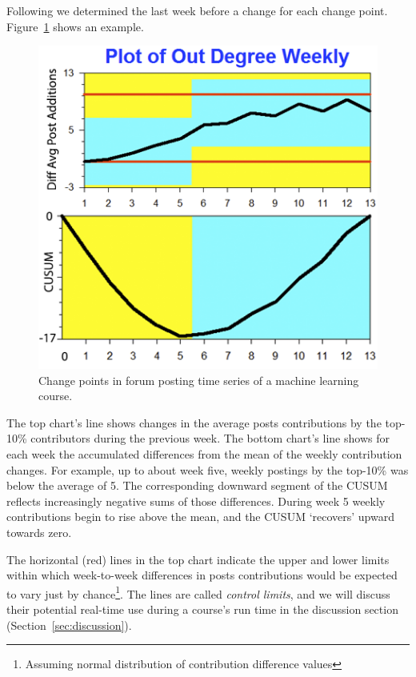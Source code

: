 
Following \cite{tayl16} we determined the last week before a change
for each change point. Figure~\ref{fig:cs229ChangePts} shows an
example.
\begin{figure}[htp]
       \centering
       \includegraphics{Figs/cs229Fall14ChangeAnalysis.png}
       \caption{\textnormal{Change points in forum posting 
           time series of a machine learning course.}}
       \label{fig:cs229ChangePts}
\end{figure}
The top chart's line shows changes in the average posts contributions
by the top-10\% contributors during the previous week. The bottom
chart's line shows for each week the accumulated differences from the
mean of the weekly contribution changes. For example, up to about week
five, weekly postings by the top-10\% was below the average of 5. The
corresponding downward segment of the CUSUM reflects increasingly
negative sums of those differences. During week 5 weekly contributions
begin to rise above the mean, and the CUSUM `recovers' upward towards
zero.

The horizontal (red) lines in the top chart indicate the upper and
lower limits within which week-to-week differences in posts
contributions would be expected to vary just by
chance\footnote{Assuming normal distribution of contribution
  difference values}. The lines are called {\em control limits}, and
we will discuss their potential real-time use during a course's run
time in the discussion section (Section~\ref{sec:discussion}).


